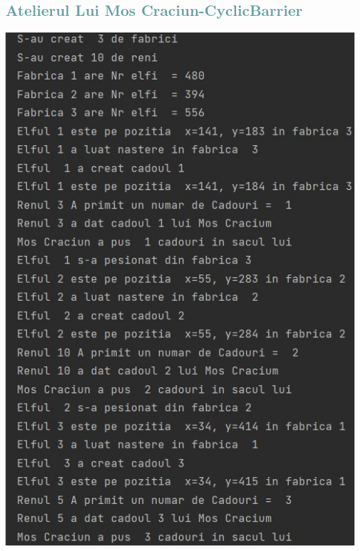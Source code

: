 \documentclass{article}
\begin{document}
\subsection{\textcolor{CadetBlue}{Atelierul Lui Mos Craciun-CyclicBarrier}}
\begin{center}
    \textbf{\includegraphics[scale=0.8]{3.jpg}}
\end{center}
\end{document}
